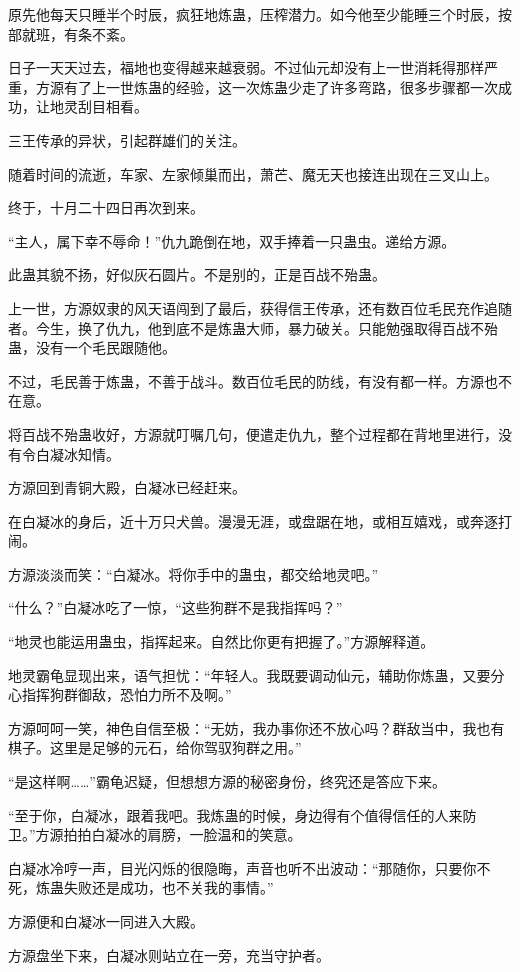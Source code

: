 \begin{this_body}
原先他每天只睡半个时辰，疯狂地炼蛊，压榨潜力。如今他至少能睡三个时辰，按部就班，有条不紊。

日子一天天过去，福地也变得越来越衰弱。不过仙元却没有上一世消耗得那样严重，方源有了上一世炼蛊的经验，这一次炼蛊少走了许多弯路，很多步骤都一次成功，让地灵刮目相看。

三王传承的异状，引起群雄们的关注。

随着时间的流逝，车家、左家倾巢而出，萧芒、魔无天也接连出现在三叉山上。

终于，十月二十四日再次到来。

“主人，属下幸不辱命！”仇九跪倒在地，双手捧着一只蛊虫。递给方源。

此蛊其貌不扬，好似灰石圆片。不是别的，正是百战不殆蛊。

上一世，方源奴隶的风天语闯到了最后，获得信王传承，还有数百位毛民充作追随者。今生，换了仇九，他到底不是炼蛊大师，暴力破关。只能勉强取得百战不殆蛊，没有一个毛民跟随他。

不过，毛民善于炼蛊，不善于战斗。数百位毛民的防线，有没有都一样。方源也不在意。

将百战不殆蛊收好，方源就叮嘱几句，便遣走仇九，整个过程都在背地里进行，没有令白凝冰知情。

方源回到青铜大殿，白凝冰已经赶来。

在白凝冰的身后，近十万只犬兽。漫漫无涯，或盘踞在地，或相互嬉戏，或奔逐打闹。

方源淡淡而笑：“白凝冰。将你手中的蛊虫，都交给地灵吧。”

“什么？”白凝冰吃了一惊，“这些狗群不是我指挥吗？”

“地灵也能运用蛊虫，指挥起来。自然比你更有把握了。”方源解释道。

地灵霸龟显现出来，语气担忧：“年轻人。我既要调动仙元，辅助你炼蛊，又要分心指挥狗群御敌，恐怕力所不及啊。”

方源呵呵一笑，神色自信至极：“无妨，我办事你还不放心吗？群敌当中，我也有棋子。这里是足够的元石，给你驾驭狗群之用。”

“是这样啊……”霸龟迟疑，但想想方源的秘密身份，终究还是答应下来。

“至于你，白凝冰，跟着我吧。我炼蛊的时候，身边得有个值得信任的人来防卫。”方源拍拍白凝冰的肩膀，一脸温和的笑意。

白凝冰冷哼一声，目光闪烁的很隐晦，声音也听不出波动：“那随你，只要你不死，炼蛊失败还是成功，也不关我的事情。”

方源便和白凝冰一同进入大殿。

方源盘坐下来，白凝冰则站立在一旁，充当守护者。


\end{this_body}
